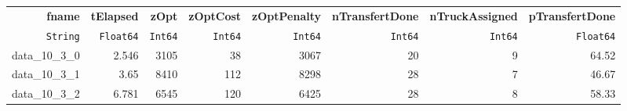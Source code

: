 \begin{tabular}{rrrrrrrr}
  \hline
  \textbf{fname} & \textbf{tElapsed} & \textbf{zOpt} & \textbf{zOptCost} & \textbf{zOptPenalty} & \textbf{nTransfertDone} & \textbf{nTruckAssigned} & \textbf{pTransfertDone} \\
  \texttt{String} & \texttt{Float64} & \texttt{Int64} & \texttt{Int64} & \texttt{Int64} & \texttt{Int64} & \texttt{Int64} & \texttt{Float64} \\\hline
  data\_10\_3\_0 & 2.546 & 3105 & 38 & 3067 & 20 & 9 & 64.52 \\
  data\_10\_3\_1 & 3.65 & 8410 & 112 & 8298 & 28 & 7 & 46.67 \\
  data\_10\_3\_2 & 6.781 & 6545 & 120 & 6425 & 28 & 8 & 58.33 \\\hline
\end{tabular}
